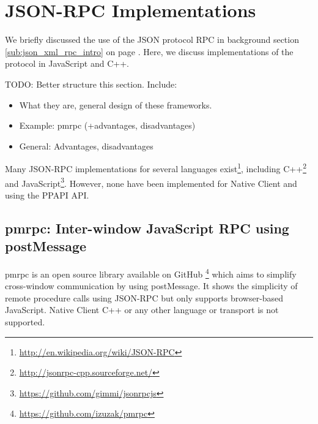 


\section{JSON-RPC Implementations} %
We briefly discussed the use of the JSON protocol RPC in background section \ref{sub:json_xml_rpc_intro} on page \pageref{sub:json_xml_rpc_intro}. Here, we discuss implementations of the protocol in JavaScript and C++.

TODO: Better structure this section. Include:
\begin{itemize}
	\item What they are, general design of these frameworks.
	\item Example: pmrpc (+advantages, disadvantages)
	\item General: Advantages, disadvantages
\end{itemize}

\label{sec:json_rpc_implementations}
Many JSON-RPC implementations for several languages exist\footnote{\url{http://en.wikipedia.org/wiki/JSON-RPC}}, including C++\footnote{\url{http://jsonrpc-cpp.sourceforge.net/}} and JavaScript\footnote{\url{https://github.com/gimmi/jsonrpcjs}}. However, none have been implemented for Native Client and using the PPAPI API.

\subsection{pmrpc: Inter-window JavaScript RPC using postMessage} %
\label{sub:pmrpc_json_rpc_using_postmessage}
pmrpc is an open source library available on GitHub \footnote{\url{https://github.com/izuzak/pmrpc}} which aims to simplify cross-window communication by using postMessage. It shows the simplicity of remote procedure calls using JSON-RPC but only supports browser-based JavaScript. Native Client C++ or any other language or transport is not supported.

